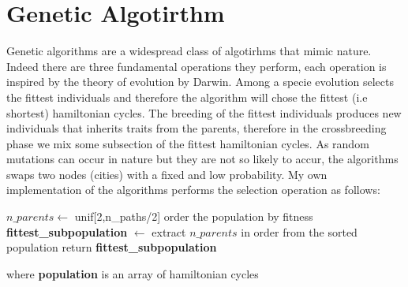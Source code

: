\documentclass{article}
\begin{document}
\section{Genetic Algotirthm}
Genetic algorithms are a widespread class of algotirhms that mimic nature. Indeed there are three fundamental operations they perform, each operation is inspired by the theory of evolution by Darwin. Among a specie evolution selects the fittest individuals and therefore the algorithm will chose the fittest (i.e shortest) hamiltonian cycles. The breeding of the fittest individuals produces new individuals that inherits traits from the parents, therefore in the crossbreeding phase we mix some subsection of the fittest hamiltonian cycles.
As random mutations can occur in nature but they are not so likely to accur, the algorithms swaps two nodes (cities) with a fixed and low probability.
My own implementation of the algorithms performs the selection operation as follows:
\begin{algorithm}[h]
    \begin{algorithmic}[1]
        \State $n\_parents \leftarrow$ unif[2,n\_paths/2]
        \State order the population by fitness
        \State \textbf{fittest\_subpopulation} $\leftarrow$ extract $n\_parents$ in order from the sorted population
        \State return \textbf{fittest\_subpopulation}
       \EndFunction
\end{algorithmic}
\end{algorithm}
\noindent where \textbf{population} is an array of hamiltonian cycles
\end{document}
